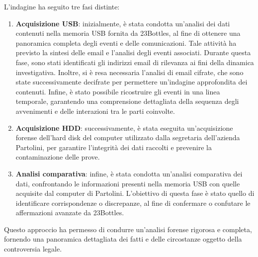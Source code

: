 
L'indagine ha seguito tre fasi distinte:

\begin{enumerate}
    \item \textbf{Acquisizione USB}: inizialmente, è stata condotta un'analisi dei dati contenuti nella memoria USB fornita da 23Bottles, al fine di ottenere una panoramica completa degli eventi e delle comunicazioni. Tale attività ha previsto la sintesi delle email e l'analisi degli eventi associati. Durante questa fase, sono stati identificati gli indirizzi email di rilevanza ai fini della dinamica investigativa. Inoltre, si è resa necessaria l'analisi di email cifrate, che sono state successivamente decifrate per permettere un'indagine approfondita dei contenuti. Infine, è stato possibile ricostruire gli eventi in una linea temporale, garantendo una comprensione dettagliata della sequenza degli avvenimenti e delle interazioni tra le parti coinvolte.
    \item \textbf{Acquisizione HDD}: successivamente, è stata eseguita un'acquisizione forense dell'hard disk del computer utilizzato dalla segretaria dell'azienda Partolini, per garantire l'integrità dei dati raccolti e prevenire la contaminazione delle prove.
    \item \textbf{Analisi comparativa}: infine, è stata condotta un'analisi comparativa dei dati, confrontando le informazioni presenti nella memoria USB con quelle acquisite dal computer di Partolini. L'obiettivo di questa fase è stato quello di identificare corrispondenze o discrepanze, al fine di confermare o confutare le affermazioni avanzate da 23Bottles.
\end{enumerate}
Questo approccio ha permesso di condurre un'analisi forense rigorosa e completa, fornendo una panoramica dettagliata dei fatti e delle circostanze oggetto della controversia legale.
